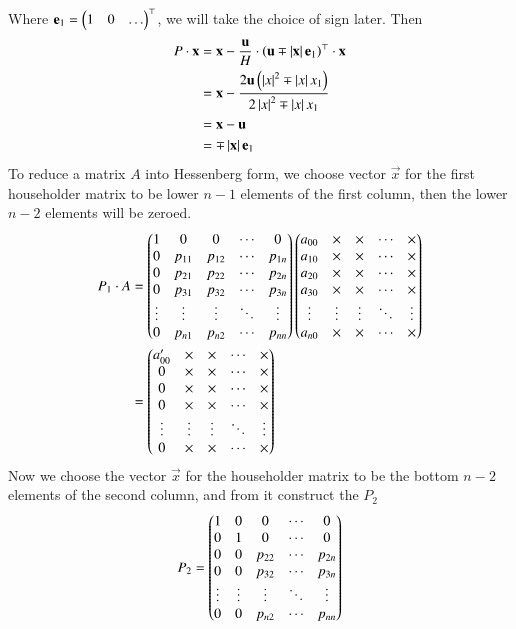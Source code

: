 \documentclass[journal]{IEEEtran}
\begin{document}
Where $\mathbf{e}_1 = \begin{pmatrix}1 & 0 & \dots\end{pmatrix}^\top$, we will take the choice of sign later. Then
\begin{align}
	P\cdot\mathbf{x} &= \mathbf{x} - \frac{\mathbf{u}}{H}\cdot\left(\mathbf{u}\mp \left\vert\mathbf{x}\right\vert\mathbf{e}_1\right)^\top\cdot \mathbf{x}\\
	              &= \mathbf{x} - \frac{2\mathbf{u}\left(\left\vert x\right\vert^2\mp \left\vert x\right\vert x_1\right)}{2\left\vert x\right\vert^2\mp \left\vert x\right\vert x_1}\\
	              &= \mathbf{x} - \mathbf{u}\\
	              &= \mp\left\vert\mathbf{x}\right\vert\mathbf{e}_1
\end{align}
To reduce a matrix $A$ into Hessenberg form, we choose vector $\vec{x}$ for the first householder matrix to be lower $n-1$ elements of the first column, then the lower $n-2$ elements will be zeroed.
\begin{align}
P_1\cdot A &= \begin{pmatrix}
1 & 0 & 0 & \cdots & 0 \\
0 & p_{11} & p_{12} & \cdots & p_{1n} \\
0      & p_{21} & p_{22} & \cdots & p_{2n} \\
0      & p_{31} & p_{32} & \cdots & p_{3n} \\
\vdots & \vdots & \vdots & \ddots & \vdots \\
0      & p_{n1} & p_{n2} & \cdots & p_{nn}
\end{pmatrix}\begin{pmatrix}
a_{00} & \times & \times & \cdots & \times \\
a_{10} & \times & \times & \cdots & \times \\
a_{20} & \times & \times & \cdots & \times \\
a_{30} & \times & \times & \cdots & \times \\
\vdots & \vdots & \vdots & \ddots & \vdots \\
a_{n0} & \times & \times & \cdots & \times
\end{pmatrix}\\
&=\begin{pmatrix}
a_{00}^\prime & \times & \times & \cdots & \times \\
0 & \times & \times & \cdots & \times \\
0      & \times & \times & \cdots & \times \\
0      & \times   & \times & \cdots & \times \\
\vdots & \vdots & \vdots & \ddots & \vdots \\
0      & \times      & \times      & \cdots & \times
\end{pmatrix}
\end{align}
Now we choose the vector $\vec{x}$ for the householder matrix to be the bottom $n-2$ elements of the second column, and from it construct the $P_2$
\begin{align}
P_2 = \begin{pmatrix}
1 & 0 & 0 & \cdots & 0 \\
0 & 1 & 0 & \cdots & 0 \\
0 & 0 & p_{22} & \cdots & p_{2n} \\
0 & 0 & p_{32} & \cdots & p_{3n} \\
\vdots & \vdots & \vdots & \ddots & \vdots \\
0 & 0 & p_{n2} & \cdots & p_{nn}
\end{pmatrix}
\end{align}
\end{document}
